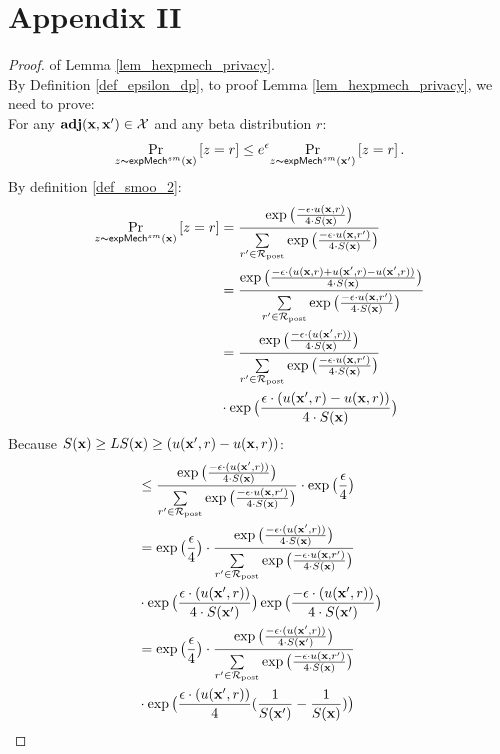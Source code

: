 \documentclass{article}
\begin{document}
\section*{Appendix II}
\label{app_privacyproof}
\begin{proof} of Lemma \ref{lem_hexpmech_privacy}.\\
  By Definition \ref{def_epsilon_dp}, to proof Lemma \ref{lem_hexpmech_privacy}, we need to prove:\\
  For any $\textbf{adj}(\textbf{x},\textbf{x}') \in \mathcal{X}$ and any beta distribution $r$:
  \begin{equation*}
  \underset{z \thicksim \mathsf{expMech}^{sm}(\textbf{x})}{\Pr}\left[ z = r \right] \leq e^{\epsilon} \underset{z \thicksim \mathsf{expMech}^{sm}(\textbf{x}')}{\Pr}\left[ z = r \right]. 
  \end{equation*}
  By definition \ref{def_smoo_2}:
  \begin{equation*}
  \begin{split}
  \underset{z \thicksim \mathsf{expMech}^{sm}(\textbf{x})}{\Pr}\left[ z = r \right] 
  & = \frac {\exp\big(\frac{-\epsilon\cdot u(\textbf{x}, {r})}{4\cdot S(\textbf{x})}\big)}{\sum\limits_{r'\in \mathcal{R}_{\textup{post}}} \exp \big(\frac{-\epsilon\cdot u(\textbf{x}, r')}{4 \cdot S(\textbf{x})}\big)} \\
  & = \frac {\exp\big(
  \frac{-\epsilon\cdot(u(\textbf{x}, {r}) + u(\textbf{x}', {r}) - u(\textbf{x}', {r}))}{4\cdot S(\textbf{x})}
  \big)}
  {\sum\limits_{r'\in \mathcal{R}_{\textup{post}}} \exp \big(\frac{-\epsilon\cdot u(\textbf{x}, r')}{4 \cdot S(\textbf{x})}\big)} \\
  & = \frac {\exp\big(
  \frac{-\epsilon\cdot(u(\textbf{x}', {r}))}{4\cdot S(\textbf{x})}
  \big)}
  {\sum\limits_{r'\in \mathcal{R}_{\textup{post}}} \exp \big(\frac{-\epsilon\cdot u(\textbf{x}, r')}{4 \cdot S(\textbf{x})}\big)}
  \\
  & \cdot \exp\big( \frac{\epsilon\cdot(u(\textbf{x}', {r}) - u(\textbf{x}, {r}))}{4\cdot S(\textbf{x})} \big)\\
  \end{split}
  \end{equation*}
  Because $S(\textbf{x}) \geq LS(\textbf{x}) \geq (u(\textbf{x}', {r}) - u(\textbf{x}, {r}))$:
  \begin{equation*}
  \begin{split}
  & \leq \frac {\exp\big(
  \frac{-\epsilon\cdot(u(\textbf{x}', {r}))}{4\cdot S(\textbf{x})}
  \big)}
  {\sum\limits_{r'\in \mathcal{R}_{\textup{post}}} \exp \big(\frac{-\epsilon\cdot u(\textbf{x}, r')}{4 \cdot S(\textbf{x})}\big)}
  \cdot \exp\big( \frac{\epsilon}{4} \big) \\
  & = \exp\big( \frac{\epsilon}{4} \big) \cdot 
  \frac {
  \exp
  \big(
  \frac{-\epsilon\cdot(u(\textbf{x}', {r}))}{4\cdot S(\textbf{x})}
  \big)
  } 
  {\sum\limits_{r'\in \mathcal{R}_{\textup{post}}} \exp \big(\frac{-\epsilon\cdot u(\textbf{x}, r')}{4 \cdot S(\textbf{x})}\big)}\\
  & \cdot \exp
  \big(
  \frac{\epsilon\cdot(u(\textbf{x}', {r}))}{4\cdot S(\textbf{x}')}
  \big)
  \exp
  \big(
  \frac{-\epsilon\cdot(u(\textbf{x}', {r}))}{4\cdot S(\textbf{x}')}
  \big)\\
  & = \exp\big( \frac{\epsilon}{4} \big) \cdot 
  \frac {
  \exp
  \big(
  \frac{-\epsilon\cdot(u(\textbf{x}', {r}))}{4\cdot S(\textbf{x}')}
  \big)
  } 
  {\sum\limits_{r'\in \mathcal{R}_{\textup{post}}} \exp \big(\frac{-\epsilon\cdot u(\textbf{x}, r')}{4 \cdot S(\textbf{x})}\big)}\\
  & \cdot \exp
  \big(
  \frac{\epsilon\cdot(u(\textbf{x}', {r}))}{4}(\frac{1}{S(\textbf{x}')} - \frac{1}{S(\textbf{x})})
  \big)\\
  \end{split}
  \end{equation*}
  

\end{proof}
\end{document}
